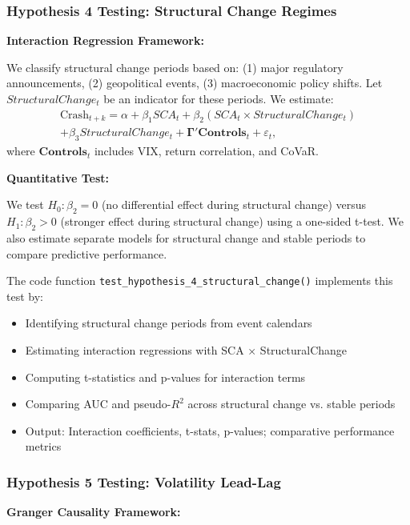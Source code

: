 \documentclass[preprint,12pt,authoryear]{elsarticle}
\begin{document}
\subsubsection{Hypothesis 4 Testing: Structural Change Regimes}

\noindent
\textbf{Interaction Regression Framework:}

We classify structural change periods based on: (1) major regulatory announcements, (2) geopolitical events, (3) macroeconomic policy shifts. Let $StructuralChange_t$ be an indicator for these periods. We estimate:
\begin{equation}
\begin{split}
\text{Crash}_{t+k} = \alpha + \beta_1 SCA_t + \beta_2 (SCA_t \times StructuralChange_t) \\
+ \beta_3 StructuralChange_t + \mathbf{\Gamma}'\mathbf{Controls}_t + \varepsilon_t,
\end{split}
\end{equation}
where $\mathbf{Controls}_t$ includes VIX, return correlation, and CoVaR.

\noindent
\textbf{Quantitative Test:}

We test $H_0: \beta_2 = 0$ (no differential effect during structural change) versus $H_1: \beta_2 > 0$ (stronger effect during structural change) using a one-sided t-test. We also estimate separate models for structural change and stable periods to compare predictive performance.

The code function \texttt{test\_hypothesis\_4\_structural\_change()} implements this test by:
\begin{itemize}
\item Identifying structural change periods from event calendars
\item Estimating interaction regressions with SCA × StructuralChange
\item Computing t-statistics and p-values for interaction terms
\item Comparing AUC and pseudo-$R^2$ across structural change vs. stable periods
\item Output: Interaction coefficients, t-stats, p-values; comparative performance metrics
\end{itemize}

\subsubsection{Hypothesis 5 Testing: Volatility Lead-Lag}

\noindent
\textbf{Granger Causality Framework:}
\end{document}
